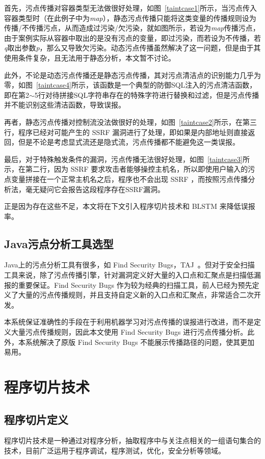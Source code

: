 首先，污点传播对容器类型无法做很好处理，如图~\ref{taintcase1}所示，当污点传入容器类型时（在此例子中为\textit{map}），静态污点传播只能将这类变量的传播规则设为传播/不传播污点，从而造成过污染/欠污染，就如图所示，若设为\textit{map}传播污点，由于案例实际从容器中取出的是没有污点的变量，即过污染，而若设为不传播，若\textit{q}取出参数\textit{p}，那么又导致欠污染。动态污点传播虽然解决了这一问题，但是由于其使用条件复杂，且无法用于静态分析，本文暂不讨论。

此外，不论是动态污点传播还是静态污点传播，其对污点清洁点的识别能力几乎为零，如图~\ref{taintcase4}所示，该函数是一个典型的防御SQL注入的污点清洁函数，即在第2$\sim$5行对待拼接SQL字符串存在的特殊字符进行替换和过滤，但是污点传播并不能识别这些清洁函数，导致误报。

再者，静态污点传播对控制流没法做很好的处理，如图~\ref{taintcase2}所示，在第三行，程序已经对可能产生的 SSRF 漏洞进行了处理，即如果是内部地址则直接返回，但是不论是考虑显式流还是隐式流，污点传播都不能避免这一类误报。

最后，对于特殊触发条件的漏洞，污点传播无法很好处理，如图~\ref{taintcase3}所示，在第二行，因为 SSRF 要求攻击者能够操控主机名，所以即使用户输入的污点变量拼接在一个正常主机名之后，程序也不会出现 SSRF ，而按照污点传播分析法，毫无疑问它会报告这段程序存在SSRF漏洞。

正是因为存在这些不足，本文将在下文引入程序切片技术和 BLSTM 来降低误报率。

\subsection{Java污点分析工具选型}
Java上的污点分析工具有很多，如 Find Security Bugs，TAJ~\cite{taint:taj}。但对于安全扫描工具来说，除了污点传播引擎，针对漏洞定义好大量的入口点和汇聚点是扫描低漏报的重要保证。Find Security Bugs 作为较为经典的扫描工具，前人已经为预先定义了大量的污点传播规则，并且支持自定义新的入口点和汇聚点，非常适合二次开发。

本系统保证准确性的手段在于利用机器学习对污点传播的误报进行改进，而不是定义大量污点传播规则，因此本文使用 Find Security Bugs 进行污点传播分析。此外，本系统解决了原版 Find Security Bugs 不能展示传播路径的问题，使其更加易用。

\section{程序切片技术}
\subsection{程序切片定义}
程序切片技术是一种通过对程序分析，抽取程序中与关注点相关的一组语句集合的技术，目前广泛运用于程序调试，程序测试，优化，安全分析等领域。

